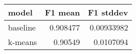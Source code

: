 \begin{tabular}{lrr}
\toprule
 model    &   F1 mean &   F1 stddev \\
\midrule
 baseline &  0.908477 &  0.00933982 \\
 k-means  &  0.90549  &  0.0107094  \\
\bottomrule
\end{tabular}